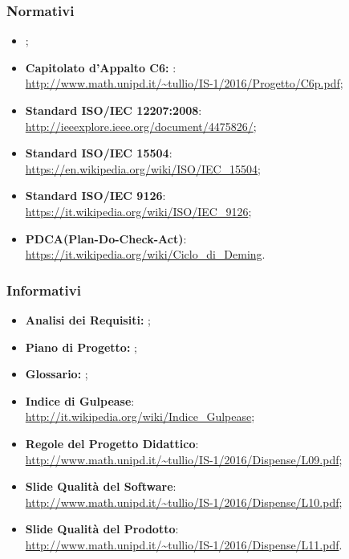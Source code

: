 		\subsubsection{Normativi}
		\begin{itemize}
			\item \emph{\NdP};
			\item \textbf{Capitolato d'Appalto C6: \proj}:
			\\ \url{http://www.math.unipd.it/~tullio/IS-1/2016/Progetto/C6p.pdf};
			\item \textbf{Standard ISO/IEC 12207:2008}:
			\\ \url{http://ieeexplore.ieee.org/document/4475826/};
			\item \textbf{Standard ISO/IEC 15504}:
			\\ \url{https://en.wikipedia.org/wiki/ISO/IEC_15504};
			\item \textbf{Standard ISO/IEC 9126}:
			\\ \url{https://it.wikipedia.org/wiki/ISO/IEC_9126};
			\item \textbf{PDCA(Plan-Do-Check-Act)}:
			\\ \url{https://it.wikipedia.org/wiki/Ciclo_di_Deming}.
		\end{itemize}
		
		\subsubsection{Informativi}
		\begin{itemize}
			\item \textbf{Analisi dei Requisiti: }\emph{\AdR};
			\item \textbf{Piano di Progetto: }\emph{\PdP};
			\item \textbf{Glossario: }\emph{\Glossario};
			\item \textbf{Indice di Gulpease}:
			\\ \url{http://it.wikipedia.org/wiki/Indice_Gulpease};
			\item \textbf{Regole del Progetto Didattico}:
			\\ \url{http://www.math.unipd.it/~tullio/IS-1/2016/Dispense/L09.pdf};
			\item \textbf{Slide Qualità del Software}:
			\\ \url{http://www.math.unipd.it/~tullio/IS-1/2016/Dispense/L10.pdf};
			\item \textbf{Slide Qualità del Prodotto}:
			\\ \url{http://www.math.unipd.it/~tullio/IS-1/2016/Dispense/L11.pdf}.
		\end{itemize}
\newpage

